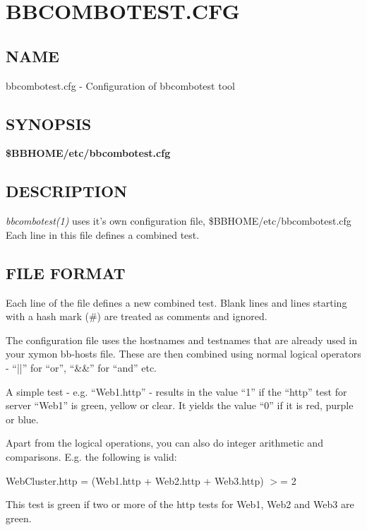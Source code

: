 %
\newpage
\section{BBCOMBOTEST.CFG}
\subsection{NAME}
 bbcombotest.cfg - Configuration of bbcombotest tool 

 
\subsection{SYNOPSIS}
\textbf{\$BBHOME/etc/bbcombotest.cfg}


 
\subsection{DESCRIPTION}
\emph{bbcombotest(1)}
 uses it's own configuration file, \$BBHOME/etc/bbcombotest.cfg Each line in this file defines a combined test. 

 
\subsection{FILE FORMAT}
 Each line of the file defines a new combined test. Blank lines and
 lines starting with a hash mark (\#) are treated as comments and
 ignored. 


  The configuration file uses the hostnames and testnames that are
  already used in your xymon bb-hosts file. These are then combined
  using normal logical operators - ``||'' for ``or'', ``\&\&'' for
  ``and'' etc. 



  A simple test - e.g. ``Web1.http'' - results in the value ``1'' if
  the ``http'' test for server ``Web1'' is green, yellow or clear. It
  yields the value ``0'' if it is red, purple or blue. 



  Apart from the logical operations, you can also do integer
  arithmetic and comparisons. E.g. the following is valid: 



  WebCluster.http = (Web1.http + Web2.http + Web3.http) $>$= 2 


  This test is green if two or more of the http tests for Web1, Web2 and Web3 are green. 


